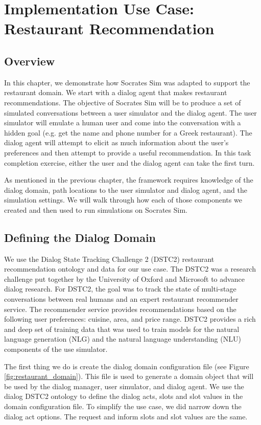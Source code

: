 \chapter{Implementation Use Case:  Restaurant Recommendation }
\label{chap:restaurant}
\section{Overview}

In this chapter, we demonstrate how Socrates Sim was adapted to support the restaurant domain. We start with a dialog agent that makes restaurant recommendations. The objective of Socrates Sim will be to produce a set of simulated conversations between a user simulator and the dialog agent. The user simulator will emulate a human user and come into the conversation with a hidden goal (e.g. get the name and phone number for a Greek restaurant). The dialog agent will attempt to elicit as much information about the user's preferences and then attempt to provide a useful recommendation.  In this task completion exercise, either the user and the dialog agent can take the first turn. 

As mentioned in the previous chapter, the framework requires knowledge of the dialog domain, path locations to the user simulator and dialog agent, and the simulation settings. We will walk through how each of those components we created and then used to run simulations on Socrates Sim.

\section{Defining the Dialog Domain}

We use the Dialog State Tracking Challenge 2 (DSTC2) restaurant recommendation ontology and data for our use case. The DSTC2 was a research challenge put together by the University of Oxford and Microsoft to advance dialog research. For DSTC2, the goal was to track the state of multi-stage conversations between real humans and an expert restaurant recommender service. The recommender service provides recommendations based on the following user preferences: cuisine, area, and price range. DSTC2 provides a rich and deep set of training data that was used to train models for the natural language generation (NLG) and the natural language understanding (NLU) components of the use simulator.

The first thing we do is create the dialog domain configuration file (see Figure \ref{fig:restaurant_domain}). This file is used to generate a domain object that will be used by the dialog manager, user simulator, and dialog agent. We use the dialog DSTC2 ontology to define the dialog acts, slots and slot values in the domain configuration file. To simplify the use case, we did narrow down the dialog act options. The request and inform slots and slot values are the same. 

